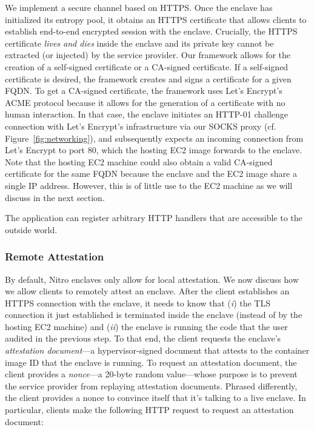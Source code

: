 We implement a secure channel based on HTTPS.  Once the enclave has initialized its
entropy pool, it obtains an HTTPS certificate that allows clients to establish
end-to-end encrypted session with the enclave.  Crucially, the HTTPS
certificate \emph{lives and dies} inside the enclave and its private key cannot
be extracted (or injected) by the service provider.  Our framework allows for
the creation of a self-signed certificate or a CA-signed certificate.  If a
self-signed certificate is desired, the framework creates and signs a
certificate for a given FQDN.  To get a CA-signed certificate, the framework
uses Let's Encrypt's ACME protocol because it allows for the generation of a
certificate with no human interaction.  In that case, the enclave initiates an
HTTP-01 challenge connection with Let's Encrypt's infrastructure via our SOCKS
proxy (cf. Figure~\ref{fig:networking}), and subsequently expects an incoming
connection from Let's Encrypt to port 80, which the hosting EC2 image forwards
to the enclave.  Note that the hosting EC2 machine could also obtain a valid
CA-signed certificate for the same FQDN because the enclave and the EC2 image
share a single IP address.  However, this is of little use to the EC2 machine
as we will discuss in the next section.

The application can register arbitrary HTTP handlers that are accessible to the
outside world.


\subsubsection{Remote Attestation}
\label{sec:attestation}

By default, Nitro enclaves only allow for local attestation.  We now discuss how
we allow clients to remotely attest an enclave.  After the client establishes an
HTTPS connection with the enclave, it needs to know that (\emph{i}) the TLS
connection it just established is terminated inside the enclave (instead of by
the hosting EC2 machine) and (\emph{ii}) the enclave is running the code that the user
audited in the previous step.  To that end, the client requests the enclave's
\emph{attestation document}---a hypervisor-signed document that attests to the
container image ID that the enclave is running.  To request an attestation
document, the client provides a \emph{nonce}---a 20-byte random value---whose
purpose is to prevent the service provider from replaying attestation documents.
Phrased differently, the client provides a nonce to convince itself that it's
talking to a live enclave.  In particular, clients make the following HTTP
request to request an attestation document:

